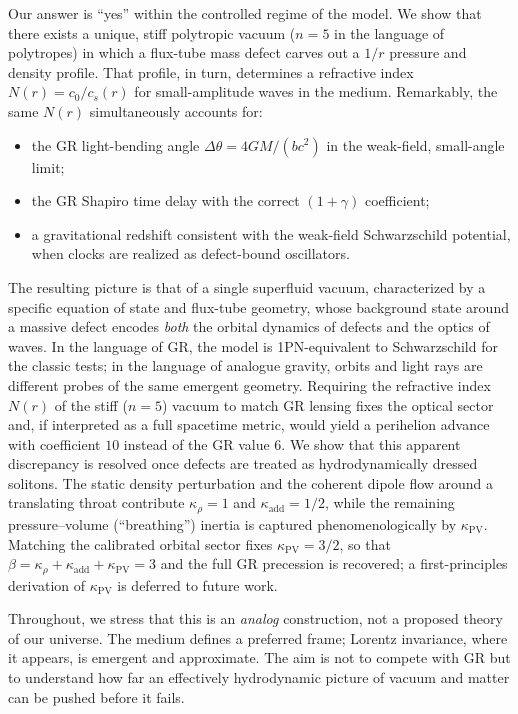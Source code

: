 \documentclass[11pt]{article}
\begin{document}
Our answer is ``yes'' within the controlled regime of the model.
We show that there exists a unique, stiff polytropic vacuum ($n=5$ in the
language of polytropes) in which a flux-tube mass defect carves out a
$1/r$ pressure and density profile.
That profile, in turn, determines a refractive index $N(r) = c_0 / c_s(r)$
for small-amplitude waves in the medium.
Remarkably, the same $N(r)$ simultaneously accounts for:

\begin{itemize}
  \item the GR light-bending angle $\Delta\theta = 4GM/(b c^2)$ in the weak-field,
        small-angle limit;
  \item the GR Shapiro time delay with the correct $(1+\gamma)$ coefficient;
  \item a gravitational redshift consistent with the weak-field Schwarzschild
        potential, when clocks are realized as defect-bound oscillators.
\end{itemize}

The resulting picture is that of a single superfluid vacuum, characterized by a
specific equation of state and flux-tube geometry, whose background state around a
massive defect encodes \emph{both} the orbital dynamics of defects and the optics
of waves.
In the language of GR, the model is 1PN-equivalent to Schwarzschild for the classic
tests; in the language of analogue gravity, orbits and light rays are different
probes of the same emergent geometry.
Requiring the refractive index $N(r)$ of the stiff ($n=5$) vacuum to match
GR lensing fixes the optical sector and, if interpreted as a full spacetime
metric, would yield a perihelion advance with coefficient $10$ instead of
the GR value $6$.
We show that this apparent discrepancy is resolved once defects are treated
as hydrodynamically dressed solitons.  The static density perturbation and the
coherent dipole flow around a translating throat contribute $\kappa_\rho = 1$
and $\kappa_{\mathrm{add}} = 1/2$, while the remaining pressure--volume
(``breathing'') inertia is captured phenomenologically by $\kappa_{\mathrm{PV}}$.
Matching the calibrated orbital sector fixes $\kappa_{\mathrm{PV}} = 3/2$, so that
$\beta = \kappa_\rho + \kappa_{\mathrm{add}} + \kappa_{\mathrm{PV}} = 3$ and the
full GR precession is recovered; a first-principles derivation of
$\kappa_{\mathrm{PV}}$ is deferred to future work.

Throughout, we stress that this is an \emph{analog} construction, not a proposed
theory of our universe.
The medium defines a preferred frame; Lorentz invariance, where it appears, is
emergent and approximate.
The aim is not to compete with GR but to understand how far an effectively
hydrodynamic picture of vacuum and matter can be pushed before it fails.
\end{document}
